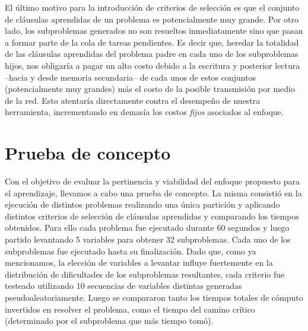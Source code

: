 El último motivo para la introducción de criterios de selección es que el
conjunto de cláusulas aprendidas de un problema es potencialmente muy grande.
Por otro lado, los subproblemas generados no son resueltos inmediatamente sino
que pasan a formar parte de la cola de tareas pendientes. Es decir que,
heredar la totalidad de las cláusulas aprendidas del problema padre en cada
uno de los subproblemas hijos, nos obligaría a pagar un alto costo debido a la
escritura y posterior lectura --hacia y desde memoria secundaria-- de cada
unos de estos conjuntos (potencialmente muy grandes) más el costo de la
posible transmisión por medio de la red. Esto atentaría directamente contra el
desempeño de nuestra herramienta, incrementando en demasía los costos
\emph{fijos} asociados al enfoque.




\section{Prueba de concepto}

Con el objetivo de evaluar la pertinencia y viabilidad del enfoque propuesto
para el aprendizaje, llevamos a cabo una prueba de concepto. La misma
consistió en la ejecución de distintos problemas realizando una única
partición y aplicando distintos criterios de selección de cláusulas aprendidas
y comparando los tiempos obtenidos. Para ello cada problema fue ejecutado
durante 60 segundos y luego partido levantando 5 variables para obtener 32
subproblemas. Cada uno de los subproblemas fue ejecutado hasta su
finalización. Dado que, como ya mencionamos, la elección de variables a
levantar influye fuertemente en la distribución de dificultades de los
subproblemas resultantes, cada criterio fue testeado utilizando 10 secuencias
de variables distintas generadas pseudoaleatoriamente. Luego se compararon
tanto los tiempos totales de cómputo invertidos en resolver el problema, como
el tiempo del camino crítico (determinado por el subproblema que más tiempo
tomó).



